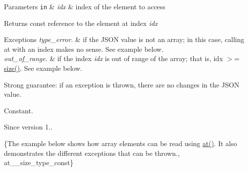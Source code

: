 \begin{DoxyParams}[1]{Parameters}
\mbox{\tt in}  & {\em idx} & index of the element to access\\
\hline
\end{DoxyParams}
\begin{DoxyReturn}{Returns}
const reference to the element at index {\itshape idx} 
\end{DoxyReturn}

\begin{DoxyExceptions}{Exceptions}
{\em type\+\_\+error.} & if the J\+S\+ON value is not an array; in this case, calling {\ttfamily at} with an index makes no sense. See example below. \\
\hline
{\em out\+\_\+of\+\_\+range.} & if the index {\itshape idx} is out of range of the array; that is, {\ttfamily idx $>$= \mbox{\hyperlink{classnlohmann_1_1basic__json_a25e27ad0c6d53c01871c5485e1f75b96}{size()}}}. See example below.\\
\hline
\end{DoxyExceptions}
Strong guarantee\+: if an exception is thrown, there are no changes in the J\+S\+ON value.

Constant.

\begin{DoxySince}{Since}
version 1..
\end{DoxySince}
\{The example below shows how array elements can be read using {\ttfamily \mbox{\hyperlink{classnlohmann_1_1basic__json_a73ae333487310e3302135189ce8ff5d8}{at()}}}. It also demonstrates the different exceptions that can be thrown., at\+\_\+\+\_\+size\+\_\+type\+\_\+const\} \mbox{\label{classnlohmann_1_1basic__json_a93403e803947b86f4da2d1fb3345cf2c}} 
